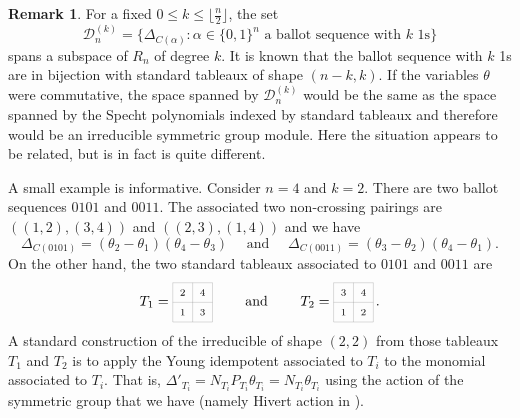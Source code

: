 \documentclass[11pt]{amsart}
\theoremstyle{definition}
\newtheorem{remark}[theorem]{Remark}
\numberwithin{equation}{section}
\begin{document}
\begin{remark} For a fixed $0\le k\le \lfloor \frac{n}{2}\rfloor$, the set
$${\mathcal D}^{(k)}_n =\big\{ \Delta_{C(\alpha)}:  \alpha \in \{0, 1\}^n \text{ a ballot sequence with $k$  1s}\big\}$$
spans a subspace of $R_n$ of degree $k$.
It is known that the ballot sequence with $k$ 1s are in bijection with standard tableaux of shape $(n-k,k)$.
If  the variables $\theta$  were  commutative, the space spanned by ${\mathcal D}^{(k)}_n$ would be the same as the space spanned
by the Specht polynomials indexed by standard tableaux and therefore
would be an irreducible symmetric group module.
Here the situation appears to be related, but is in fact is quite different.

A small example is informative.
Consider $n=4$ and $k=2$.
There are two ballot sequences $0101$ and $0011$.
The associated two non-crossing pairings are
$((1,2),(3,4))$ and $((2,3),(1,4))$ and we have 
$$\Delta_{C(0101)}=  (\theta_{2}-\theta_{1})(\theta_{4}-\theta_{3}) \quad\text{ and }\quad \Delta_{C(0011)}=(\theta_{3}-\theta_{2})(\theta_{4}-\theta_{1}).
$$  
On the other hand, the two standard tableaux associated to $0101$ and $0011$ are
$$ 
T_1=\begin{tikzpicture}[scale=0.5,baseline=12pt] 
	\draw[help lines] (0,0) grid (2,2);
	\node at (.5,.5){$\scriptstyle 1$};
	\node at (.5,1.5){$\scriptstyle 2$};
	\node at (1.5,.5){$\scriptstyle 3$};
	\node at (1.5,1.5){$\scriptstyle 4$};
\end{tikzpicture}
\qquad\text{ and }\qquad
T_2=\begin{tikzpicture}[scale=0.5,baseline=12pt] 
	\draw[help lines] (0,0) grid (2,2);
	\node at (.5,.5){$\scriptstyle 1$};
	\node at (.5,1.5){$\scriptstyle 3$};
	\node at (1.5,.5){$\scriptstyle 2$};
	\node at (1.5,1.5){$\scriptstyle 4$};
\end{tikzpicture}\,.
$$
A standard construction of the irreducible of shape  $(2,2)$ from those tableaux $T_1$ and $T_2$
is to apply the Young idempotent associated to $T_i$ to the monomial associated to $T_i$.
That is, $\Delta'_{T_i}=N_{T_i}P_{T_i} \theta_{T_i}=N_{T_i}\theta_{T_i}$
using the action of the symmetric group that we have (namely Hivert action in \cite{H} ).



\end{remark}
\end{document}
